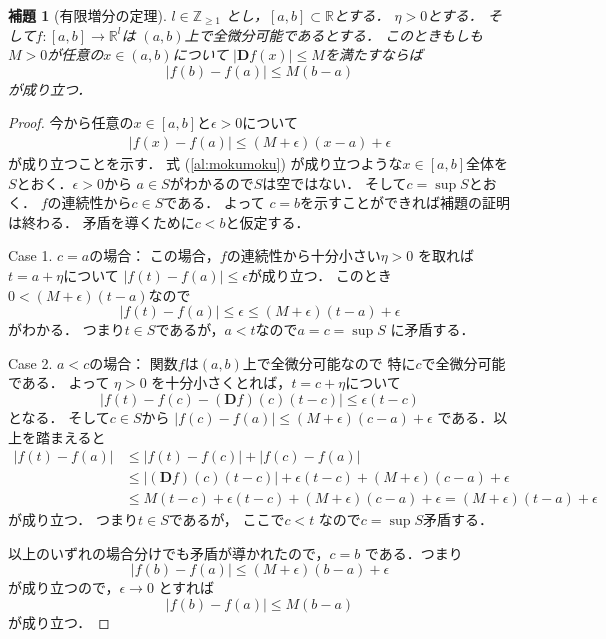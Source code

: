 \documentclass[leqno, a4paper, 12pt]{jsarticle}
\newtheorem{lem}[thm]{補題}
\newcommand{\zz}{\mathbb{Z}}
\newcommand{\rr}{\mathbb{R}}
\newcommand{\ddd}{\mathbf{D}}
\begin{document}
\begin{lem}[有限増分の定理]\label{lem:increment}
$l\in \zz_{\ge 1}$
とし，$[a, b]\subset \rr$とする．
$\eta>0$とする．
そして$f: [a, b]\to \rr^{l}$は
$(a, b)$上で全微分可能であるとする．
このときもしも$M>0$が任意の$x\in (a, b)$について
$|\ddd f(x)|\le M$を満たすならば
\[
|f(b)-f(a)|\le M(b-a)
\]
が成り立つ．
\end{lem}
\begin{proof}
今から任意の$x\in [a, b]$と$\epsilon>0$について
\begin{align}\label{al:mokumoku}
|f(x)-f(a)|\le (M+\epsilon)(x-a)+\epsilon
\end{align}
が成り立つことを示す．
式 (\ref{al:mokumoku})
が成り立つような$x\in [a, b]$全体を
$S$とおく．$\epsilon>0$から
$a\in S$がわかるので$S$は空ではない．
そして$c=\sup S$とおく．
$f$の連続性から$c\in S$である．
よって
$c=b$を示すことができれば補題の証明は終わる．
矛盾を導くために$c<b$と仮定する．

Case 1. $c=a$の場合：
この場合，$f$の連続性から十分小さい$\eta>0$
を取れば$t=a+\eta$について
$|f(t)-f(a)|\le \epsilon$が成り立つ．
このとき$0<(M+\epsilon)(t-a)$なので
\[
|f(t)-f(a)|\le \epsilon
\le (M+\epsilon)(t-a)+\epsilon
\]
がわかる．
つまり$t\in S$であるが，$a<t$なので$a=c=\sup S$
に矛盾する．

Case 2. $a<c$の場合：
関数$f$は$(a, b)$上で全微分可能なので
特に$c$で全微分可能である．
よって
$\eta>0$
を十分小さくとれば，$t=c+\eta$について
\[
|f(t)-f(c)-(\ddd f)(c)(t-c)|\le \epsilon (t-c)
\]
となる．
そして$c\in S$から
$|f(c)-f(a)|\le (M+\epsilon)(c-a)+\epsilon$
である．以上を踏まえると
\begin{align*}
|f(t)-f(a)|&\le 
|f(t)-f(c)|+|f(c)-f(a)|
\\
&\le |(\ddd f)(c)(t-c)|+\epsilon(t-c)+
 (M+\epsilon)(c-a)+\epsilon
\\
& \le M(t-c)+\epsilon(t-c)+
 (M+\epsilon)(c-a)+\epsilon
 =(M+\epsilon)(t-a)+\epsilon
\end{align*}
が成り立つ．
つまり$t\in S$であるが，
ここで$c<t$
なので$c=\sup S$矛盾する．

以上のいずれの場合分けでも矛盾が導かれたので，$c=b$
である．つまり
\[
|f(b)-f(a)|\le (M+\epsilon)(b-a)+\epsilon
\]
が成り立つので，$\epsilon\to 0$
とすれば
\[
|f(b)-f(a)|\le M(b-a)
\]
が成り立つ．
\end{proof}
\end{document}
